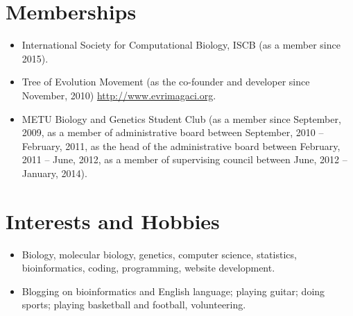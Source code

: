 \documentclass[a4paper,12pt]{article}
\newcommand{\resumeItemNoTitle}[1]{
  \item\small{
    {#1\vspace{-2pt}}
  }
}
\newcommand{\resumeSubItemSingle}[1]{\resumeItemNoTitle{#1}\vspace{-4pt}}
\newcommand{\resumeSubHeadingListStart}{\begin{itemize}[leftmargin=*]}
\newcommand{\resumeSubHeadingListEnd}{\end{itemize}}
\begin{document}
\section{Memberships}
  \resumeSubHeadingListStart
    \resumeSubItemSingle{International Society for Computational Biology, ISCB (as a member since 2015).}
    \resumeSubItemSingle{Tree of Evolution Movement (as the co-founder and developer since November, 2010) \href{http://www.evrimagaci.org}{http://www.evrimagaci.org}.}
    \resumeSubItemSingle{METU Biology and Genetics Student Club (as a member since September, 2009, as a member of administrative board between September, 2010 -- February, 2011, as the head of the administrative board between February, 2011 -- June, 2012, as a member of supervising council between June, 2012 -- January, 2014).}
  \resumeSubHeadingListEnd

\section{Interests and Hobbies}
  \resumeSubHeadingListStart
    \resumeSubItemSingle{Biology, molecular biology, genetics, computer science, statistics, bioinformatics, coding, programming, website development.}
    \resumeSubItemSingle{Blogging on bioinformatics and English language; playing guitar; doing sports; playing basketball and football, volunteering.}
  \resumeSubHeadingListEnd

\end{document}
